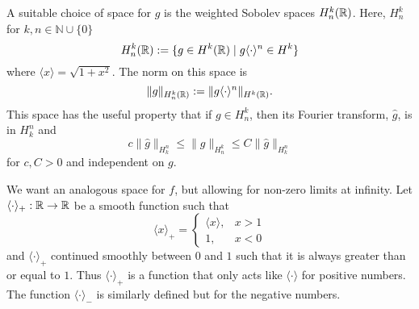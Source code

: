 A suitable choice of space for \(g\) is the weighted Sobolev spaces \(H^k_n(\mathbb{R})\). Here, \(H^k_n\) for \(k,n\in\mathbb N\cup \{0\}\)
\begin{equation}
	H^k_n(\mathbb{R}) := \{ g\in H^k(\mathbb{R}) \mid   g\langle \cdot \rangle^n \in H^k \}
\end{equation}
where \(\langle x \rangle = \sqrt{1+x^2}\). The norm on this space is
\begin{equation}
	\| g \|_{H^k_n(\mathbb{R})} := \|  g \langle \cdot \rangle^n\|_{H^k(\mathbb{R})}.
\end{equation}
This space has the useful property that if \(g \in H^k_n\), then its Fourier transform, \(\hat g \), is in \(H^n_k\) and 
\begin{equation}
	c \| \hat g \|_{H^n_k} \leq \| g \|_{H^k_n} \leq C \| \hat g \|_{H^n_k}
\end{equation}
for \(c,C>0\) and independent on \(g\).

We want an analogous space for \(f\), but allowing for non-zero limits at infinity. Let \(\langle\cdot \rangle_+ :\mathbb{R} \to \mathbb{R}\) be a smooth function such that
\begin{equation}
	\langle x \rangle_+ = \begin{cases} \langle x \rangle, & x>1 \\ 1, & x<0\end{cases}
\end{equation}
and \(\langle \cdot \rangle_+\) continued smoothly between \(0\) and \(1\) such that it is always greater than or equal to \(1\). Thus \(\langle \cdot \rangle_+\) is a function that only acts like \(\langle \cdot \rangle\) for positive numbers. The function \(\langle \cdot \rangle_-\) is similarly defined but for the negative numbers.

